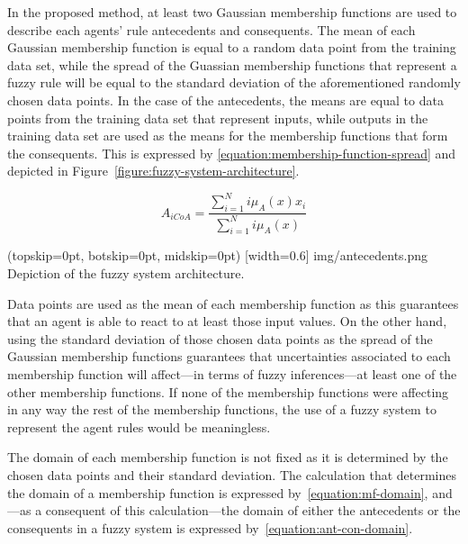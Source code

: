 \documentclass{ieeeaccess}
\begin{document}
In the proposed method, at least two Gaussian membership functions are used to
describe each agents' rule antecedents and consequents. The mean of each Gaussian
membership function is equal to a random data point from the training data set,
while the spread of the Guassian membership functions that represent a fuzzy
rule will be equal to the standard deviation of the aforementioned randomly
chosen data points. 
In the case of the antecedents, the means are equal to data
points from the training data set that represent inputs, while outputs in the
training data set are used as the means for the membership functions that form
the consequents. This is expressed by
\ref{equation:membership-function-spread} and depicted in
Figure~\ref{figure:fuzzy-system-architecture}.

\begin{equation}
  \label{equation:membership-function-spread}
  A_{iCoA} = \dfrac{\sum_{i=1}^{N} i\mu_{A}(x) x_{i}}{\sum_{i=1}^{N}
    i\mu_{A}(x)}
\end{equation}

\Figure[](topskip=0pt, botskip=0pt, midskip=0pt)
[width=0.6\linewidth]
{img/antecedents.png}
{Depiction of the fuzzy system architecture.
  \label{figure:fuzzy-system-architecture}}

Data points are used as the mean of each membership function as this guarantees
that an agent is able to react to at least those input values. On the other hand,
using the standard deviation of those chosen data points as the spread of the
Gaussian membership functions guarantees that uncertainties associated to each
membership function will affect---in terms of fuzzy inferences---at least one of
the other membership functions. If none of the membership functions were
affecting in any way the rest of the membership functions, the use of a fuzzy
system to represent the agent rules would be meaningless. 


The domain of each membership function is not fixed as it is determined by the
chosen data points and their standard deviation. The calculation that determines
the domain of a membership function is expressed by~\ref{equation:mf-domain}, and---as a consequent of this
calculation---the domain of either the antecedents or the consequents in a fuzzy
system is expressed by~\ref{equation:ant-con-domain}. %
\end{document}
